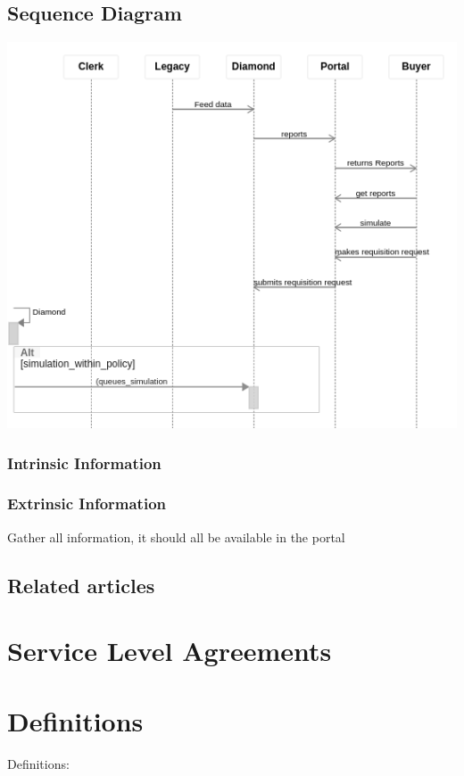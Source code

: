 \documentclass[letterpaper,10pt,english]{sphinxmanual}
\begin{document}
\section{Sequence Diagram}
\label{Questions:sequence-diagram}
\includegraphics{Requisitions1.png}


\subsection{Intrinsic Information}
\label{Questions:intrinsic-information}

\subsection{Extrinsic Information}
\label{Questions:extrinsic-information}
Gather all information, it should all be available in the portal


\section{Related articles}
\label{Questions:related-articles}

\chapter{Service Level Agreements}
\label{Questions:service-level-agreements}

\chapter{Definitions}
\label{Questions:definitions}
Definitions:
\end{document}
